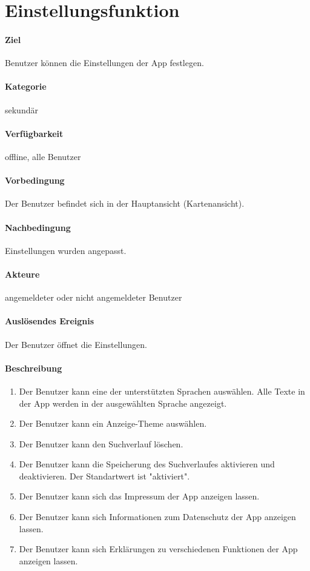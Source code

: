 \section{Einstellungsfunktion}
\paragraph{Ziel}
Benutzer können die Einstellungen der App festlegen.
\paragraph{Kategorie}
sekundär
\paragraph{Verfügbarkeit}
offline, alle Benutzer
\paragraph{Vorbedingung}
Der Benutzer befindet sich in der Hauptansicht (Kartenansicht).
\paragraph{Nachbedingung}
Einstellungen wurden angepasst.
\paragraph{Akteure}
angemeldeter oder nicht angemeldeter Benutzer
\paragraph{Auslösendes Ereignis}
Der Benutzer öffnet die Einstellungen.
\paragraph{Beschreibung}
\begin{enumerate}
    \item Der Benutzer kann eine der unterstützten Sprachen auswählen. Alle Texte in der App werden in der ausgewählten Sprache angezeigt.
    \item Der Benutzer kann ein Anzeige-Theme auswählen.
    \item Der Benutzer kann den Suchverlauf löschen.
    \item Der Benutzer kann die Speicherung des Suchverlaufes aktivieren und deaktivieren. Der Standartwert ist "aktiviert".
    \item Der Benutzer kann sich das Impressum der App anzeigen lassen.
    \item Der Benutzer kann sich Informationen zum Datenschutz der App anzeigen lassen.
    \item Der Benutzer kann sich Erklärungen zu verschiedenen Funktionen der App anzeigen lassen.
\end{enumerate}